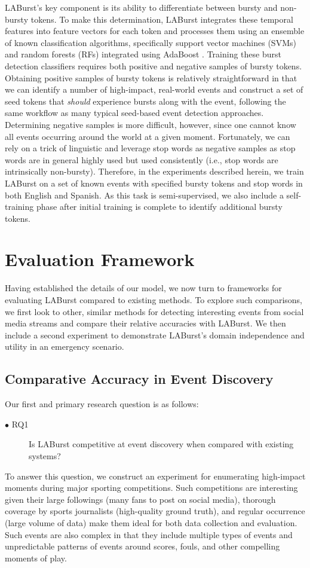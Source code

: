\documentclass[letterpaper]{article}
\begin{document}
LABurst's key component is its ability to differentiate between bursty and non-bursty tokens.
To make this determination, LABurst integrates these temporal features into feature vectors for each token and processes them using an ensemble of known classification algorithms, specifically support vector machines (SVMs) and random forests (RFs) integrated using AdaBoost \cite{scikit-learn}.
Training these burst detection classifiers requires both positive and negative samples of bursty tokens.
Obtaining positive samples of bursty tokens is relatively straightforward in that we can identify a number of high-impact, real-world events and construct a set of seed tokens that \emph{should} experience bursts along with the event, following the same workflow as many typical seed-based event detection approaches.
Determining negative samples is more difficult, however, since one cannot know all events occurring around the world at a given moment.
Fortunately, we can rely on a trick of linguistic and leverage stop words as negative samples as stop words are in general highly used but used consistently (i.e., stop words are intrinsically non-bursty).
Therefore, in the experiments described herein, we train LABurst on a set of known events with specified bursty tokens and stop words in both English and Spanish.
As this task is semi-supervised, we also include a self-training phase after initial training is complete to identify additional bursty tokens.

\section{Evaluation Framework}
\label{sect:methods}

Having established the details of our model, we now turn to frameworks for evaluating LABurst compared to existing methods.
To explore such comparisons, we first look to other, similar methods for detecting interesting events from social media streams and compare their relative accuracies with LABurst.
We then include a second experiment to demonstrate LABurst's domain independence and utility in an emergency scenario.

\subsection{Comparative Accuracy in Event Discovery}

Our first and primary research question is as follows:
\begin{description}
\item[$\bullet$ RQ1] Is LABurst competitive at event discovery when compared with existing systems?
\end{description}
To answer this question, we construct an experiment for enumerating high-impact moments during major sporting competitions.
Such competitions are interesting given their large followings (many fans to post on social media), thorough coverage by sports journalists (high-quality ground truth), and regular occurrence (large volume of data) make them ideal for both data collection and evaluation.
Such events are also complex in that they include multiple types of events and unpredictable patterns of events around scores, fouls, and other compelling moments of play.
\end{document}
